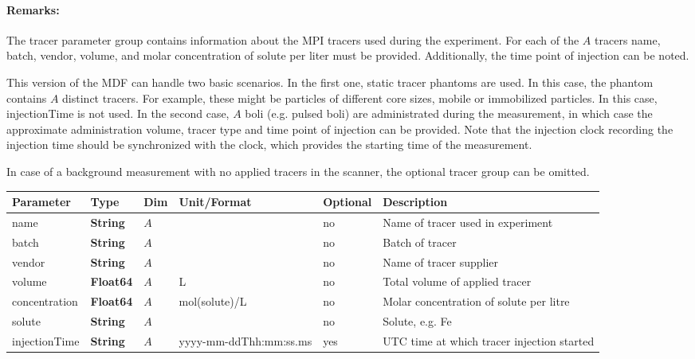 \documentclass[landscape,a4paper]{article} %
\newcommand{\inltab}[1]{{\ttfamily\bfseries\color{blue}#1}}
\newcommand{\inlvar}[1]{{\ttfamily#1}}
\begin{document}
\begin{multicols}{2}
\paragraph{Remarks:} The tracer parameter group contains information about the MPI tracers used during the experiment. For each of the $A$ tracers \inlvar{name}, \inlvar{batch}, \inlvar{vendor}, \inlvar{volume},  and molar \inlvar{concentration} of \inlvar{solute} per liter must be provided. Additionally, the time point of injection can be noted.

This version of the MDF can handle two basic scenarios. In the first one, static tracer phantoms are used. In this case, the phantom contains $A$ distinct tracers. For example, these might be particles of different core sizes, mobile or immobilized particles. In this case, \inlvar{injectionTime} is not used. In the second case, $A$ boli (e.g. pulsed boli) are administrated during the measurement, in which case the approximate administration volume, tracer type and time point of injection can be provided. Note that the injection clock recording the injection time should be synchronized with the clock, which provides the starting time of the measurement.

In case of a background measurement with no applied tracers in the scanner, the optional tracer group can be omitted.
\end{multicols}

\noindent \begin{tabularx}{\columnwidth}{lllllX} 
\textbf{Parameter} & \textbf{Type} & \textbf{Dim} & \textbf{Unit/Format} & \textbf{Optional} & \textbf{Description} \\ \hline 
\inlvar{name} & \inltab{String} & $A$ & & no & Name of tracer used in experiment \\ \hline
\inlvar{batch} & \inltab{String} & $A$ & & no & Batch of tracer \\ \hline
\inlvar{vendor} & \inltab{String} & $A$ & & no & Name of tracer supplier \\ \hline
\inlvar{volume} & \inltab{Float64} & $A$ & L & no & Total volume of applied tracer \\ \hline
\inlvar{concentration} & \inltab{Float64} & $A$ & mol(\inlvar{solute})/L & no & Molar concentration of \inlvar{solute} per litre \\ \hline
\inlvar{solute} & \inltab{String} & $A$ & & no & Solute, e.g. Fe \\ \hline
\inlvar{injectionTime} & \inltab{String} & $A$ & yyyy-mm-ddThh:mm:ss.ms & yes & UTC time at which tracer injection started \\ \hline
\end{tabularx}
\end{document}
